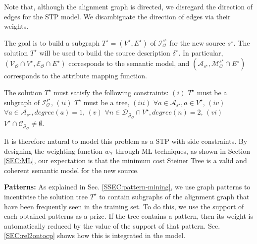 \documentclass[letterpaper]{article} %
\newcommand{\authornote}[3]{
  {\fbox{\sc 
  #1}:$\blacktriangleright$\textcolor{#2}{\small{#3}}$\blacktriangleleft$}%
}
\newcommand{\npr}[1]{\authornote{NPR}{orange}{#1}}
\newcommand{\forijcai}[1]{}
\begin{document}
Note that, although the alignment graph is directed, we disregard the
direction of edges for the STP model.
We disambiguate the direction \forijcai{and semantics} of edges via their
weights.
\forijcai{We can further improve this step by using patterns.}

The goal is to build a subgraph $T^\star= (V^\star, E^\star)$ of
$\mathcal{I}_\mathcal{O}^{s^\star}$ for the new source $s^\star$. The solution 
$T^\star$ will 
be used to build the source description $\delta^\star$. 
In particular, $(\mathcal{V_O} \cap V^\star,\mathcal{E_O} \cap E^\star)$ 
corresponds to the semantic model, and 
$(\mathcal{A}_{s^\star},\mathcal{M}_\mathcal{O}^{s^\star} \cap E^\star)$ 
corresponds to 
the attribute mapping function.

The solution $T^\star$ must satisfy the following constraints:
	$(i)$ %
	$T^\star$ must be a subgraph of $\mathcal{I}_\mathcal{O}^{s^\star}$,
	$(ii)$ %
	$T^\star$ must be a tree,
	$(iii)$ %
	$\forall a \in \mathcal{A}_{s^\star}, a\in V^\star$,
	$(iv)$ %
	$\forall a \in \mathcal{A}_{s^\star}, degree(a) = 1$,
	$(v)$ %
	$\forall n \in \mathcal{D_{G_O}} \cap V^\star, degree(n) = 2$,
	$(vi)$ 
	$V^\star \cap \mathcal{C_{G_O}} \neq \emptyset$.

It is therefore natural to model this problem as a STP with side constraints.
By designing the weighting function $w_\mathcal{I}$ through 
ML techniques, as shown in Section \ref{SEC:ML}, 
our expectation is that the minimum cost Steiner Tree is a valid and coherent semantic model for the new source.

\textbf{Patterns:}
As explained in Sec. \ref{SSEC:pattern-mining}, we use 
graph patterns to incentivise the solution tree 
$T^\star$ to contain subgraphs of the alignment graph that have been frequently 
seen in the training set.
To do this, we use the support of each obtained patterns as a prize. If 
the tree contains a pattern, then its weight is automatically reduced by the 
value of the support of that pattern. Sec. \ref{SEC:rel2ontocp} shows how this is integrated in the model.
\end{document}
